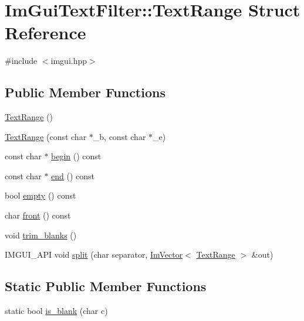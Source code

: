 \hypertarget{struct_im_gui_text_filter_1_1_text_range}{}\section{Im\+Gui\+Text\+Filter\+:\+:Text\+Range Struct Reference}
\label{struct_im_gui_text_filter_1_1_text_range}


{\ttfamily \#include $<$imgui.\+hpp$>$}

\subsection*{Public Member Functions}
\begin{DoxyCompactItemize}
\item 
\hyperlink{struct_im_gui_text_filter_1_1_text_range_a5a6548fd40884ef5837e6a1ffa33af61}{Text\+Range} ()
\item 
\hyperlink{struct_im_gui_text_filter_1_1_text_range_a4a2b377d4fd141fc3664378041f9f007}{Text\+Range} (const char $\ast$\+\_\+b, const char $\ast$\+\_\+e)
\item 
const char $\ast$ \hyperlink{struct_im_gui_text_filter_1_1_text_range_ab6b04c316f081e8ad7b044a8afbda63c}{begin} () const
\item 
const char $\ast$ \hyperlink{struct_im_gui_text_filter_1_1_text_range_aa5d60286f4c35bfdde82219ff079de9e}{end} () const
\item 
bool \hyperlink{struct_im_gui_text_filter_1_1_text_range_ab8d74e3b0ce63997746828e4b8ae3bbf}{empty} () const
\item 
char \hyperlink{struct_im_gui_text_filter_1_1_text_range_a7d0b405b4db5d33351812b4b3b6e9107}{front} () const
\item 
void \hyperlink{struct_im_gui_text_filter_1_1_text_range_aa3bbd8b17b528f548d73c0936228dc85}{trim\+\_\+blanks} ()
\item 
I\+M\+G\+U\+I\+\_\+\+A\+PI void \hyperlink{struct_im_gui_text_filter_1_1_text_range_a9e0a0d6079e10128cde4d89c04b8f566}{split} (char separator, \hyperlink{class_im_vector}{Im\+Vector}$<$ \hyperlink{struct_im_gui_text_filter_1_1_text_range}{Text\+Range} $>$ \&out)
\end{DoxyCompactItemize}
\subsection*{Static Public Member Functions}
\begin{DoxyCompactItemize}
\item 
static bool \hyperlink{struct_im_gui_text_filter_1_1_text_range_ade5e15395ae2bcef6b37bf22a68cc6e6}{is\+\_\+blank} (char c)
\end{DoxyCompactItemize}
